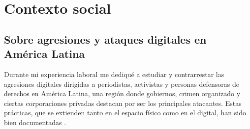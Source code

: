 \documentclass[12pt]{caltech_thesis}
\begin{document}





\chapter{Contexto social}

\section{Sobre agresiones y ataques digitales en América Latina}

Durante mi experiencia laboral me dediqué a estudiar y contrarrestar las agresiones digitales dirigidas a periodistas, activistas y personas defensoras de derechos en América Latina, una región donde gobiernos, crimen organizado y ciertas corporaciones privadas destacan por ser los principales atacantes. Estas prácticas, que se extienden tanto en el espacio físico como en el digital, han sido bien documentadas \citep{AmnestyInternational-Mexico-2023, Articulo19-Reporte-2022, Articulo19-Reporte-2023, CIMAC-Informe-2022, Internews-Reporte-2023}.
\end{document}
